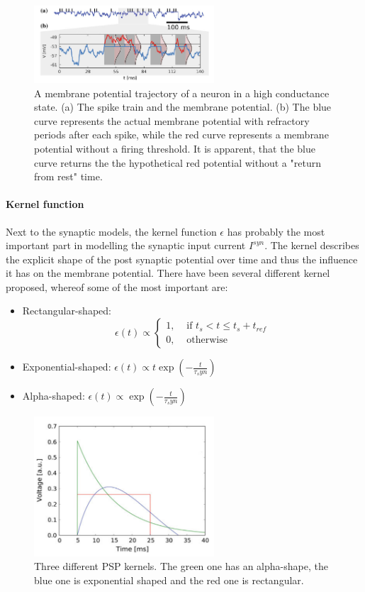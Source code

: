 \begin{figure}
	\centering
    	\includegraphics[width=0.6\textwidth]{imgs/hcs.png} 
    \caption{A membrane potential trajectory of a neuron in a high conductance state. (a) The spike train and the membrane potential. (b) The blue curve represents the actual membrane potential with refractory periods after each spike, while the red curve represents a membrane potential without a firing threshold. It is apparent, that the blue curve returns the the hypothetical red potential without a "return from rest" time. }
	\label{fig:hcs}
\end{figure}


\paragraph{Kernel function}

Next to the synaptic models, the kernel function $\epsilon$ has probably the most important part in modelling the synaptic input current $I^{syn}$. 
The kernel describes the explicit shape of the post synaptic potential over time and thus the influence it has on the membrane potential.
There have been several different kernel proposed, whereof some of the most important are:
\begin{itemize}
\item Rectangular-shaped: \[\epsilon(t) \propto  \begin{cases} 1, & \text{ if } t_{s} < t \le t_{s} + t_{ref} \\ 0, & \text{ otherwise } \end{cases} \]
\item Exponential-shaped: $\epsilon(t) \propto t \exp(- \frac{t}{\tau_syn})$
\item Alpha-shaped: $\epsilon(t) \propto \exp(- \frac{t}{\tau_syn})$
\end{itemize}

\begin{figure}
	\centering
    	\includegraphics[width=0.6\textwidth]{imgs/psp_kernel.png} 
    \caption{Three different PSP kernels. The green one has an alpha-shape, the blue one is exponential shaped and the red one is rectangular. }
	\label{fig:pspkernels}
\end{figure}


